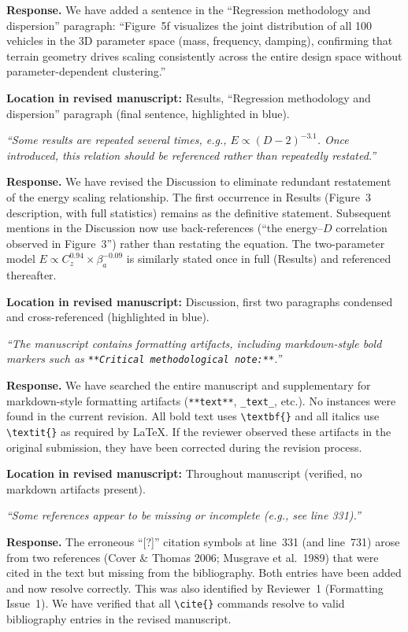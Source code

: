 \documentclass[11pt]{article}
\newcommand{\revquote}[1]{\medskip\noindent\textit{``#1''}\medskip}
\newcommand{\revloc}[1]{\noindent\textbf{Location in revised manuscript:} #1\medskip}
\begin{document}
\noindent\textbf{Response.} We have added a sentence in the ``Regression methodology and dispersion'' paragraph: ``Figure~5f visualizes the joint distribution of all 100 vehicles in the 3D parameter space (mass, frequency, damping), confirming that terrain geometry drives scaling consistently across the entire design space without parameter-dependent clustering.''

\revloc{Results, ``Regression methodology and dispersion'' paragraph (final sentence, highlighted in blue).}

\bigskip

\revquote{Some results are repeated several times, e.g., $E \propto (D-2)^{-3.1}$. Once introduced, this relation should be referenced rather than repeatedly restated.}

\noindent\textbf{Response.} We have revised the Discussion to eliminate redundant restatement of the energy scaling relationship. The first occurrence in Results (Figure~3 description, with full statistics) remains as the definitive statement. Subsequent mentions in the Discussion now use back-references (``the energy--$D$ correlation observed in Figure~3'') rather than restating the equation. The two-parameter model $E \propto C_z^{0.94} \times \beta_a^{-0.09}$ is similarly stated once in full (Results) and referenced thereafter.

\revloc{Discussion, first two paragraphs condensed and cross-referenced (highlighted in blue).}

\bigskip

\revquote{The manuscript contains formatting artifacts, including markdown-style bold markers such as \texttt{**Critical methodological note:**}.}

\noindent\textbf{Response.} We have searched the entire manuscript and supplementary for markdown-style formatting artifacts (\texttt{**text**}, \texttt{\_text\_}, etc.). No instances were found in the current revision. All bold text uses \texttt{\textbackslash textbf\{\}} and all italics use \texttt{\textbackslash textit\{\}} as required by \LaTeX. If the reviewer observed these artifacts in the original submission, they have been corrected during the revision process.

\revloc{Throughout manuscript (verified, no markdown artifacts present).}

\bigskip

\revquote{Some references appear to be missing or incomplete (e.g., see line 331).}

\noindent\textbf{Response.} The erroneous ``[?]'' citation symbols at line~331 (and line~731) arose from two references (Cover \& Thomas 2006; Musgrave et al.\ 1989) that were cited in the text but missing from the bibliography. Both entries have been added and now resolve correctly. This was also identified by Reviewer~1 (Formatting Issue~1). We have verified that all \texttt{\textbackslash cite\{\}} commands resolve to valid bibliography entries in the revised manuscript.
\end{document}
